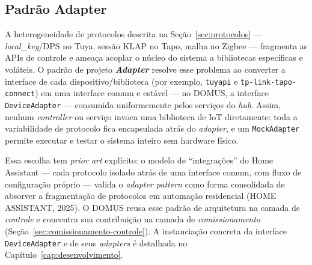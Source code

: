 \subsection{Padrão Adapter}\label{sec:adapter}

A heterogeneidade de protocolos descrita na Seção~\ref{sec:protocolos} ---
\textit{local\_key}/DPS no Tuya, sessão KLAP no Tapo, malha no Zigbee ---
fragmenta as APIs de controle e ameaça acoplar o núcleo do sistema a bibliotecas
específicas e voláteis. O padrão de projeto \textbf{\textit{Adapter}} resolve esse
problema ao converter a interface de cada dispositivo/biblioteca (por exemplo,
\texttt{tuyapi} e \texttt{tp-link-tapo-connect}) em uma interface comum e estável ---
no DOMUS, a interface \texttt{DeviceAdapter} --- consumida uniformemente pelos
serviços do \textit{hub}. Assim, nenhum \textit{controller} ou serviço invoca uma
biblioteca de IoT diretamente: toda a variabilidade de protocolo fica encapsulada
atrás do \textit{adapter}, e um \texttt{MockAdapter} permite executar e testar o
sistema inteiro sem hardware físico.

Essa escolha tem \textit{prior art} explícito: o modelo de ``integrações'' do Home
Assistant --- cada protocolo isolado atrás de uma interface comum, com fluxo de
configuração próprio --- valida o \textit{adapter pattern} como forma consolidada de
absorver a fragmentação de protocolos em automação residencial (HOME ASSISTANT, 2025).
O DOMUS reusa esse padrão de arquitetura na camada de \textit{controle} e concentra
sua contribuição na camada de \textit{comissionamento} (Seção~\ref{sec:comissionamento-controle}).
A instanciação concreta da interface \texttt{DeviceAdapter} e de seus
\textit{adapters} é detalhada no Capítulo~\ref{cap:desenvolvimento}.
